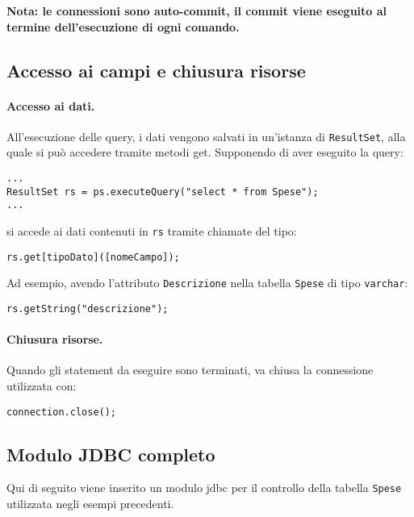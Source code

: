 \documentclass[a4paper, 10pt]{article}
\begin{document}
\noindent
\textbf{Nota: le connessioni sono auto-commit, il commit viene eseguito al termine dell'esecuzione di ogni comando.}

\subsection{Accesso ai campi e chiusura risorse}
\paragraph{Accesso ai dati.}
All'esecuzione delle query, i dati vengono salvati in un'istanza di \lstinline|ResultSet|, alla quale si può accedere tramite metodi get.
Supponendo di aver eseguito la query:
\begin{lstlisting}
...
ResultSet rs = ps.executeQuery("select * from Spese");
...
\end{lstlisting}
si accede ai dati contenuti in \lstinline|rs| tramite chiamate del tipo:
\begin{lstlisting}
rs.get[tipoDato]([nomeCampo]);
\end{lstlisting}

Ad esempio, avendo l'attributo \lstinline|Descrizione| nella tabella \lstinline|Spese| di tipo \lstinline|varchar|:
\begin{lstlisting}
rs.getString("descrizione");
\end{lstlisting}

\paragraph{Chiusura risorse.}
Quando gli statement da eseguire sono terminati, va chiusa la connessione utilizzata con:
\begin{lstlisting}
connection.close();
\end{lstlisting}

\subsection{Modulo JDBC completo}
Qui di seguito viene inserito un modulo jdbc per il controllo della tabella \lstinline|Spese| utilizzata negli esempi precedenti.
\end{document}
